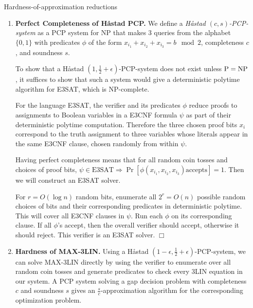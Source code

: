 \documentclass[12pt]{article}
\makeatletter
\renewcommand{\section}{\@startsection{section}{1}{0mm}
   {\baselineskip}%
   {\baselineskip}{\normalfont\normalsize}}%
\makeatother
\begin{document}
\setcounter{section}{0}
\section{Hardness-of-approximation reductions}

\begin{enumerate}

\item
\textbf{Perfect Completeness of H\aa stad PCP.}
We define a \textit{H\aa stad $(c,s)$-PCP-system} as a
PCP system for NP that makes 3 queries from the alphabet $\{0,1\}$
with predicates $\phi$ of the form $x_{i_1}+x_{i_2}+x_{i_3} = b \mod 2$,
completeness $c$, and soundness $s$.

To show that a H\aa stad $(1,\frac{1}{2}+\epsilon)$-PCP-system does not
exist unless $\mathrm{P}=\mathrm{NP}$, it suffices to show that such a system would give a
deterministic polytime algorithm for E3SAT, which is NP-complete.

For the language E3SAT, the verifier and its predicates $\phi$ reduce
proofs to assignments to Boolean variables in a E3CNF formula $\psi$ as part of
their deterministic polytime computation. Therefore the three chosen
proof bits $x_i$ correspond to the truth assignment to three variables
whose literals appear in the same E3CNF clause, chosen randomly from within
$\psi$.

Having perfect completeness means that for all random coin tosses and
choices of proof bits,
$\psi \in \textrm{E3SAT} \Rightarrow \Pr{\left[\phi(x_{i_1}, x_{i_2}, x_{i_3}) \textrm{accepts} \right]} = 1$. Then we will construct an E3SAT solver.

For $r = O(\log n)$ random bits, enumerate all $2^r = O(n)$ possible random
choices of bits and their corresponding predicates in deterministic
polytime. This will cover all E3CNF clauses in $\psi$. Run each $\phi$ on its
corresponding clause. If all $\phi$'s accept, then the overall verifier should
accept, otherwise it should reject. This verifier is an E3SAT solver.
$\Box$

\item
\textbf{Hardness of MAX-3LIN.}
Using a H\aa stad $(1-\epsilon,\frac{1}{2}+\epsilon)$-PCP-system, we can solve
MAX-3LIN directly by using the verifier to enumerate over all random coin
tosses and generate predicates to check every 3LIN equation in our system.
A PCP system solving a gap decision problem with completeness $c$ and
soundness $s$ gives
an $\frac{s}{c}$-approximation algorithm for the corresponding
optimization problem.


\end{enumerate}
\end{document}
